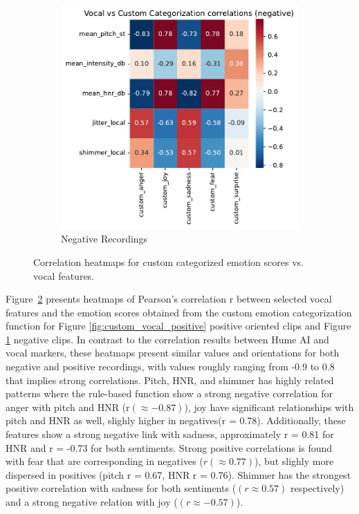 \begin{figure}[H]
\begin{subfigure}[b]{0.45\textwidth}
        \includegraphics[width=\textwidth]{png/results/rq1_nr3/vocal_vs_custom_categorization_correlations_negative.png.pdf}
        \caption{Negative Recordings}        
        \label{fig:custom_vocal_negative}
    \end{subfigure} 
    \caption{Correlation heatmaps for custom categorized emotion scores vs. vocal features.}
    \label{fig:rq1_heatmaps_custom}       
\end{figure}
Figure~\ref{fig:rq1_heatmaps_custom} presents heatmaps of Pearson’s correlation r between selected vocal features and the emotion scores obtained from the custom emotion categorization 
function for Figure \ref{fig:custom_vocal_positive} positive oriented clips and Figure \ref{fig:custom_vocal_negative} negative clips. In contrast to the correlation results between Hume AI and vocal markers, these heatmaps present similar values and orientations for both negative and positive recordings, with values roughly ranging from -0.9 to 0.8 that implies strong correlations. 
Pitch, HNR, and shimmer has highly related patterns where the rule-based function show a strong negative correlation for anger with pitch and HNR (r$(\approx -0.87)$), joy have significant relationships with pitch and HNR as well, slighly higher in negatives(r = 0.78). Additionally, these features show a strong negative link with sadness, approximately r = 0.81 for HNR and r = -0.73 for both sentiments. Strong positive correlations is found with fear that are corresponding in negatives ($r (\approx 0.77)$), but slighly more dispersed in positives (pitch r = 0.67, HNR r = 0.76). 
Shimmer has the strongest positive correlation with sadness for both sentiments ($(r \approx 0.57)$ respectively) and a strong negative relation with joy ($(r \approx -0.57)$). 

